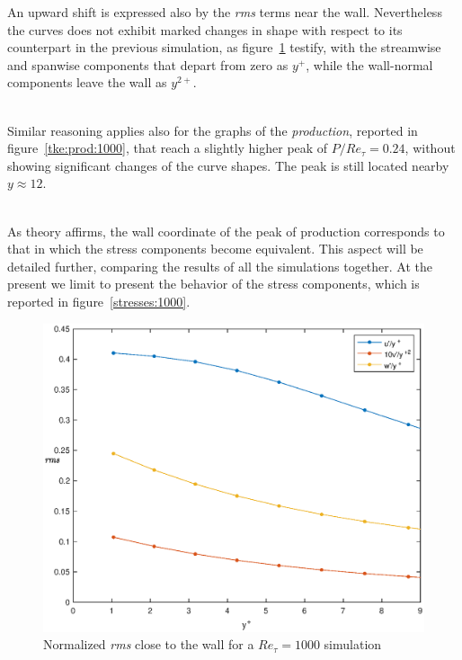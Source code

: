An upward shift is expressed also by the \emph{rms} terms near the wall. Nevertheless the curves does not exhibit marked changes in shape with respect to its counterpart in the previous simulation, as figure~\ref{wall:rms:1000} testify, with the streamwise and spanwise components that depart from zero as $y^{+}$, while the wall-normal components leave the wall as $y^{2+}$. \\~\par

Similar reasoning applies also for the graphs of the \emph{production}, reported in figure~\ref{tke:prod:1000}, that reach a slightly higher peak of $P/Re_{\tau}=0.24$, without showing significant changes of the curve shapes. The peak is still located nearby $y\approx 12$.\\~\par

As theory affirms, the wall coordinate of the peak of production corresponds to that in which the stress components become equivalent. This aspect will be detailed further, comparing the results of all the simulations together.
At the present we limit to present the behavior of the stress components, which is reported in figure~\ref{stresses:1000}.

\begin{figure}
\begin{center}
\includegraphics[scale=0.55]{grafici/wall_rms_1000.eps}
\caption{Normalized \emph{rms} close to the wall for a $Re_{\tau}=1000$ simulation}
\label{wall:rms:1000}
\end{center} 
\end{figure}

